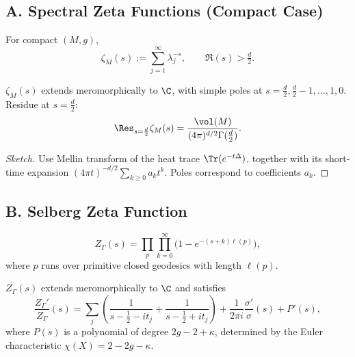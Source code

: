 \subsection*{A. Spectral Zeta Functions (Compact Case)}
\label{subsec:zeta-compact}

\begin{definition}
For compact $(M,g)$,
\[
  \zeta_M(s) := \sum_{j=1}^\infty \lambda_j^{-s}, \qquad \Re(s)>\tfrac d2.
\]
\end{definition}

\begin{theorem}
\label{thm:zetaM-meromorphic}
$\zeta_M(s)$ extends meromorphically to $\C$, with simple poles at $s=\tfrac d2, \tfrac d2-1, \dots, 1,0$. 
Residue at $s=\tfrac d2$:
\[
  \Res_{s=\frac d2}\zeta_M(s) = \frac{\vol(M)}{(4\pi)^{d/2}\Gamma(\tfrac d2)}.
\]
\end{theorem}

\begin{proof}[Sketch]
Use Mellin transform of the heat trace $\Tr(e^{-t\Delta})$, together with its short-time expansion $(4\pi t)^{-d/2}\sum_{k\ge0} a_k t^k$. 
Poles correspond to coefficients $a_k$.
\end{proof}

\subsection*{B. Selberg Zeta Function}
\label{subsec:selberg-zeta}

\begin{definition}
\[
  Z_\Gamma(s) = \prod_{p}\prod_{k=0}^\infty \bigl(1 - e^{-(s+k)\ell(p)}\bigr),
\]
where $p$ runs over primitive closed geodesics with length $\ell(p)$.
\end{definition}

\begin{theorem}
\label{thm:selberg-derivative}
$Z_\Gamma(s)$ extends meromorphically to $\C$ and satisfies
\begin{equation}\label{eq:Zprime-over-Z}
  \frac{Z_\Gamma'}{Z_\Gamma}(s) 
  = \sum_j\left(\frac{1}{s-\tfrac12-it_j}+\frac{1}{s-\tfrac12+it_j}\right)
  + \frac{1}{2\pi i}\frac{\sigma'}{\sigma}(s) + P'(s),
\end{equation}
where $P(s)$ is a polynomial of degree $2g-2+\kappa$, determined by the Euler characteristic $\chi(X)=2-2g-\kappa$.
\end{theorem}

